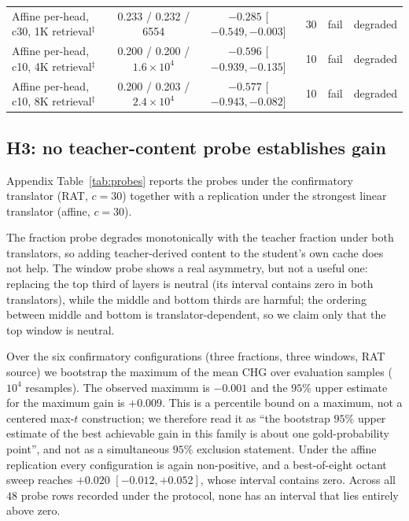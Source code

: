 \documentclass{article} %
\begin{document}
\begin{table}[t]
{\begin{tabular}{lccccl}
Affine per-head, c30, 1K retrieval$^{\ddagger}$ & 0.233 / 0.232 / 6554 & $-0.285$ [$-0.549, -0.003$] & 30 & fail & degraded \\
Affine per-head, c10, 4K retrieval$^{\ddagger}$ & 0.200 / 0.200 / $1.6\times10^{4}$ & $-0.596$ [$-0.939, -0.135$] & 10 & fail & degraded \\
Affine per-head, c10, 8K retrieval$^{\ddagger}$ & 0.200 / 0.203 / $2.4\times10^{4}$ & $-0.577$ [$-0.943, -0.082$] & 10 & fail & degraded \\
\bottomrule
\end{tabular}}
\end{table}

\subsection{H3: no teacher-content probe establishes gain}
\label{sec:h3}
Appendix Table~\ref{tab:probes} reports the probes under the confirmatory
translator (RAT, $c{=}30$) together with a replication under the strongest
linear translator (affine, $c{=}30$).

The fraction probe degrades monotonically with the teacher fraction under both
translators, so adding teacher-derived content to the student's own cache does
not help. The window probe shows a real asymmetry, but not a useful one:
replacing the top third of layers is neutral (its interval contains zero in both
translators), while the middle and bottom thirds are harmful; the ordering
between middle and bottom is translator-dependent, so we claim only that the
top window is neutral.

Over the six confirmatory configurations (three fractions, three windows, RAT
source) we bootstrap the maximum of the mean CHG over evaluation samples
($10^4$ resamples). The observed maximum is $-0.001$ and the $95\%$ upper
estimate for the maximum gain is $+0.009$. This is a percentile bound on a
maximum, not a centered max-$t$ construction; we therefore read it as
``the bootstrap $95\%$ upper estimate of the best achievable gain in this family
is about one gold-probability point'', and not as a simultaneous $95\%$
exclusion statement. Under the affine replication every configuration is again
non-positive, and a best-of-eight octant sweep reaches $+0.020$
$[-0.012,+0.052]$, whose interval contains zero. Across all $48$ probe rows
recorded under the protocol, none has an interval that lies entirely above zero.

\end{document}
